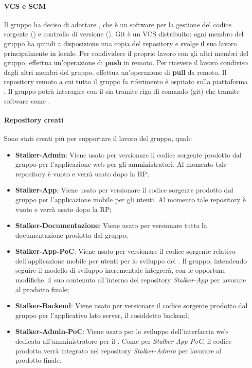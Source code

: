 \paragraph{VCS e SCM} 
Il gruppo ha deciso di adottare , che è un software per la gestione del codice sorgente () e controllo di versione ().
Git è un VCS distribuito: ogni membro del gruppo \Gruppo{} ha quindi a disposizione una copia del repository e svolge il suo lavoro principalmente in locale.
Per condividere il proprio lavoro con gli altri membri del gruppo, effettua un'operazione di \textbf{push} in remoto.
Per ricevere il lavoro condiviso dagli altri membri del gruppo, effettua un'operazione di \textbf{pull} da remoto.
Il repository remoto a cui tutto il gruppo fa riferimento è ospitato sulla piattaforma .
Il gruppo \Gruppo{} potrà interagire con il  sia tramite riga di comando (git) che tramite software come .

\paragraph{Repository creati}
Sono stati creati più  per supportare il lavoro del gruppo, quali:
\begin{itemize}
	\item \textbf{Stalker-Admin}: Viene usato per versionare il codice sorgente prodotto dal gruppo per l'applicazione web per gli amministratori. Al momento tale repository è vuoto e verrà usato dopo la RP;
	\item \textbf{Stalker-App}: Viene usato per versionare il codice sorgente prodotto dal gruppo per l'applicazione mobile per gli utenti. Al momento tale repository è vuoto e verrà usato dopo la RP;
	\item \textbf{Stalker-Documentazione}: Viene usato per versionare tutta la documentazione prodotta dal gruppo;
	\item \textbf{Stalker-App-PoC}: Viene usato per versionare il codice sorgente relativo dell'applicazione mobile per utenti per lo sviluppo del .
	Il gruppo, intendendo seguire il modello di sviluppo incrementale integrerà, con le opportune modifiche, il suo contenuto all'interno del repository \textit{Stalker-App} per lavorare al prodotto finale;
	\item \textbf{Stalker-Backend}: Viene usato per versionare il codice sorgente prodotto dal gruppo per l'applicativo lato server, il cosiddetto backend;
	\item \textbf{Stalker-Admin-PoC}: Viene usato per lo sviluppo dell'interfaccia web dedicata all'amministratore per il .
	Come per \textit{Stalker-App-PoC}, il codice prodotto verrà integrato nel repository \textit{Stalker-Admin} per lavorare al prodotto finale.
\end{itemize}

